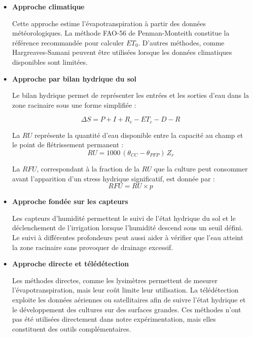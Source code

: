 \begin{itemize}[label=$\bullet$]
   	\item \textbf{Approche climatique}
 
    Cette approche estime l'évapotranspiration à partir des données météorologiques. La méthode FAO-56 de Penman-Monteith \cite{allen_crop_1998-1} constitue la référence recommandée pour calculer $ET_0$. D'autres méthodes, comme Hargreaves-Samani \cite{koc_reference_2023} peuvent être utilisées lorsque les données climatiques disponibles sont limitées.

   	\item \textbf{Approche par bilan hydrique du sol}
   	
    Le bilan hydrique permet de représenter les entrées et les sorties d’eau dans la zone racinaire sous une forme simplifiée :

    \begin{equation}
    \Delta S = P + I + R_c - ET_c - D - R
    \label{eq:bilan_hydrique}
    \end{equation}

    La $RU$ représente la quantité d’eau disponible entre la capacité au champ et le point de flétrissement permanent :
    \begin{equation}
    RU = 1000\,(\theta_{CC} - \theta_{PFP})\,Z_r
    \label{eq:ru}
    \end{equation}

    La $RFU$, correspondant à la fraction de la $RU$ que la culture peut consommer avant l’apparition d’un stress hydrique significatif, est donnée par :
    \begin{equation}
        RFU = RU \times p
        \label{eq:rfu}
    \end{equation}

    \item \textbf{Approche fondée sur les capteurs}
    
    Les capteurs d'humidité permettent le suivi de l'état hydrique du sol et le déclenchement de l'irrigation lorsque l'humidité descend sous un seuil défini. Le suivi à différentes profondeurs peut aussi aider à vérifier que l'eau atteint la zone racinaire sans provoquer de drainage excessif.

    \item \textbf{Approche directe et télédétection}

    Les méthodes directes, comme les lysimètres permettent de mesurer l'évapotranspiration, mais leur coût limite leur utilisation. La télédétection exploite les données aériennes ou satellitaires afin de suivre l'état hydrique et le développement des cultures sur des surfaces grandes. Ces méthodes n'ont pas été utilisées directement dans notre expérimentation, mais elles constituent des outils complémentaires.

\end{itemize}

